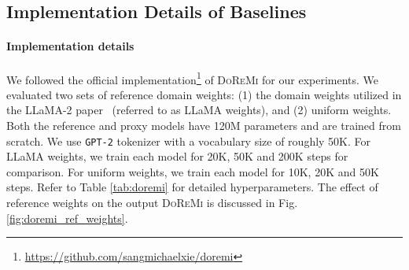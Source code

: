 \documentclass{article} %
\newcommand{\call}[1]{\textbf{\textcolor{orange}{[Call: #1]}}}
\begin{document}
\begin{appendices}{}







\subsection{Implementation Details of Baselines}
\label{sec:appendix_baseline_details}

\paragraph{Implementation details} We followed the official implementation\footnote{\url{https://github.com/sangmichaelxie/doremi}} of \textsc{DoReMi} for our experiments. We evaluated two sets of reference domain weights: (1) the domain weights utilized in the LLaMA-2 paper~\cite{touvron2023llama} (referred to as LLaMA weights), and (2) uniform weights. Both the reference and proxy models have 120M parameters and are trained from scratch. We use \texttt{GPT-2} tokenizer with a vocabulary size of roughly 50K. For LLaMA weights, we train each model for 20K, 50K and 200K steps for comparison. For uniform weights, we train each model for 10K, 20K and 50K steps. Refer to Table \ref{tab:doremi} for detailed hyperparameters.  The effect of reference weights on the output \textsc{DoReMi} is discussed in Fig.\ref{fig:doremi_ref_weights}.



\end{appendices}
\end{document}

